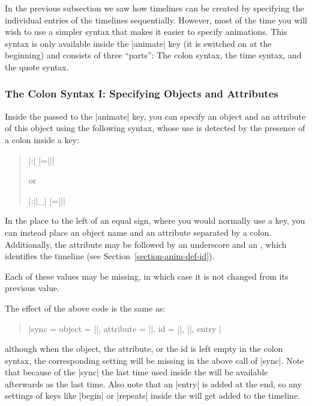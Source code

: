 \label{section-anim-syntax-animate}

In the previous subsection we saw how timelines can be created by
specifying the individual entries of the timelines
sequentially. However, most of the time you will wish to use a simpler
syntax that makes it easier to specify animations. This syntax is 
only available inside the |animate| key (it is switched on at the
beginning) and consists of three ``parts'': The colon syntax, the time
syntax, and the quote syntax.

\subsubsection{The Colon Syntax I: Specifying Objects and Attributes}

\label{section-anim-syntax-obj}

Inside the  passed to the |animate| key,
you can specify an object and an attribute of this object using the
following syntax, whose use is detected by the presence of a colon
inside a key: 
\begin{quote}
  \normalfont
  |:|
  |={||}|
  
  or
  
  |:||_|
  |={||}| 
\end{quote}
In the place to the left of an equal sign, where you would
normally use a key, you can instead place an object name and an
attribute separated by a colon. Additionally, the attribute may be
followed by an underscore and an , which identifies the
timeline (see Section~\ref{section-anim-def-id}). 

Each of these values may be missing, in which case it is not changed
from its previous value.

The effect of the above code is the same as:
\begin{quote}
  \normalfont
  |sync = { object = ||, attribute = ||, id = ||, ||, entry }|
\end{quote}
although when the object, the attribute, or the id is left empty in
the colon syntax, the corresponding setting will be missing in the
above call of |sync|. Note that because of the |sync| the last time
used inside the  will be available afterwards as the
last time. Also note that an |entry| is added at the end, so any
settings of keys like |begin| or |repeats| inside the 
will get added to the timeline.

